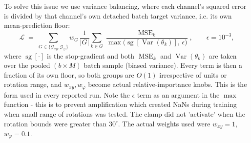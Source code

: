 \documentclass[final_report.tex]{subfiles}
\begin{document}
To solve this issue we use variance balancing, where each channel's squared error is divided by that channel's own detached batch target variance, i.e. its own mean-prediction floor:
\begin{equation}\label{eq:loss-variance}
  \mathcal{L}
  \;=\;
  \sum_{G \in \{\mathcal{G}_{xy}, \mathcal{G}_{\varphi}\}} \!\! w_G \,
  \frac{1}{|G|} \sum_{k \in G}
  \frac{\operatorname{MSE}_k}{\max\!\bigl(\operatorname{sg}[\operatorname{Var}(\theta_k)],\, \epsilon\bigr)},
  \qquad \epsilon = 10^{-3},
\end{equation}
where $\operatorname{sg}[\cdot]$ is the stop-gradient and both $\operatorname{MSE}_k$ and
$\operatorname{Var}(\theta_k)$ are taken over the pooled $(b \times M)$ batch sample
(biased variance). Every term is then a fraction of its own floor, so both
groups are $O(1)$ irrespective of units or rotation range, and $w_{xy}, w_\varphi$
become actual relative-importance knobs. This is the form used in every reported run. Note the $\epsilon$ term as an argument in the $\max$ function - this is to prevent amplification which created NaNs during training when small range of rotations was tested. The clamp did not 'activate' when the rotation bounds were greater than $30^\circ$. The actual weights used were $w_{xy}=1$, $w_\varphi=0.1$.
\end{document}
